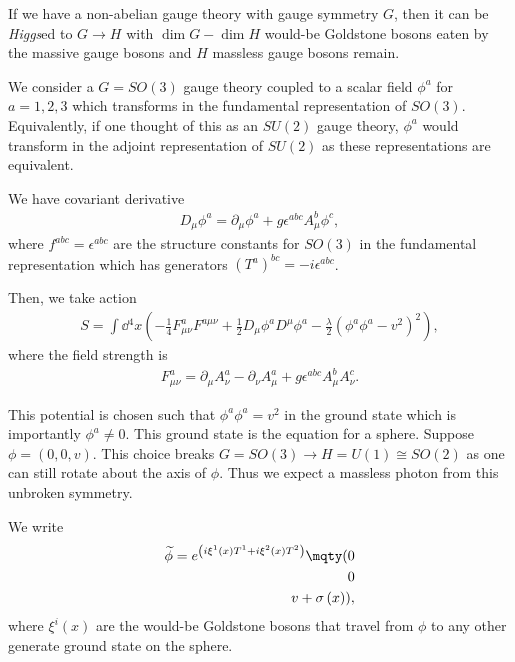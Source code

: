 
If we have a non-abelian gauge theory with gauge symmetry $G$, then it can be \emph{Higgs}ed to $G \to H$ with $\dim G - \dim H$ would-be Goldstone bosons eaten by the massive gauge bosons and $H$ massless gauge bosons remain.

We consider a $G = SO \left( 3 \right) $  gauge theory coupled to a scalar field $\phi^{a}$ for $a = 1,2,3$ which transforms in the fundamental representation of $SO \left( 3 \right) $. Equivalently, if one thought of this as an $SU \left( 2 \right) $ gauge theory, $\phi^{a}$ would transform in the adjoint representation of $SU\left( 2 \right) $ as these representations are equivalent.

We have covariant derivative
\begin{align}
    D_\mu \phi^{a} = \partial_\mu \phi^{a} + g \epsilon^{abc} A^{b}_\mu \phi^{c}
,\end{align}
where $f^{abc} = \epsilon^{abc}$ are the structure constants for $SO \left( 3 \right) $ in the fundamental representation which has generators $\left( T^{a} \right)^{bc} = -i \epsilon^{abc}$.

Then, we take action
\begin{align}
    S = \int \dd{^{4}x} \left( -\frac{1}{4}F_{\mu \nu}^{a} F^{a \mu \nu} + \frac{1}{2} D_\mu \phi^{a} D^{\mu} \phi^{a} - \frac{\lambda}{2} \left( \phi^{a} \phi^{a} - v^2 \right)^2 \right) 
,\end{align}
where the field strength is
\begin{align}
    F^{a}_{\mu \nu} = \partial_\mu A_\nu^{a} - \partial_\nu A_\mu^{a} + g\epsilon^{abc} A_\mu^{b} A_\nu^{c}
.\end{align}

This potential is chosen such that $\phi^{a} \phi^{a} = v^2$ in the ground state which is importantly $\phi^{a} \neq 0$. This ground state is the equation for a sphere. Suppose $\phi = \left( 0,0,v \right) $. This choice breaks $G = SO \left( 3 \right) \to H = U\left( 1 \right) \cong SO \left( 2 \right)  $ as one can still rotate about the axis of $\phi$. Thus we expect a massless photon from this unbroken symmetry.

We write
\begin{align}
    \widetilde{\phi} = e^{\left( i \xi^{1}\left( x \right) T^{1} + i \xi^{2}\left( x \right) T^2 \right) } \mqty( 0 \\ 0 \\ v + \sigma \left( x \right) )
,\end{align}
where $\xi^{i}\left( x \right) $ are the would-be Goldstone bosons that travel from $\phi$ to any other generate ground state on the sphere.

